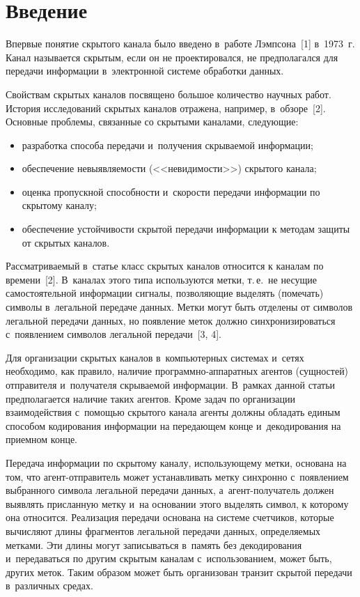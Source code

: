 \begin{multicols}{2}

\label{st\stat}
     
\section{Введение}
  
  Впервые понятие скрытого канала было введено в~работе Лэмпсона~[1] 
в~1973~г. Канал называется скрытым, если он не проектировался, не 
предполагался для передачи информации в~электронной системе обработки 
данных. 
  
  Свойствам скрытых каналов посвящено большое количество научных работ. 
История иссле\-дований скрытых каналов отражена, например, в~обзоре~[2]. 
Основные проблемы, связанные со скрытыми каналами, следующие:
  \begin{itemize}
\item разработка способа передачи и~получения скрываемой информации;
\item обеспечение невыявляемости (<<невидимости>>) скрытого канала;
\item оценка пропускной способности и~скорости передачи информации 
по скрытому каналу;
\item обеспечение устойчивости скрытой передачи информации к методам 
защиты от скрытых каналов. 
\end{itemize}

  Рассматриваемый в~статье класс скрытых каналов относится к каналам по 
времени~[2]. В~каналах этого типа используются метки, т.\,е.\ не несущие 
самостоятельной информации сигналы, позволяющие выделять (помечать) 
символы в~легальной передаче данных. Метки могут быть отделены от 
символов легальной передачи данных, но появление меток должно 
синхронизироваться с~появлением символов легальной передачи~[3, 4].
  
  Для организации скрытых каналов в~компьютерных системах и~сетях 
необходимо, как правило, наличие про\-граммно-ап\-па\-рат\-ных агентов 
(сущностей) отправителя и~получателя скрываемой информации. В~рамках 
данной статьи предполагается наличие таких агентов. Кроме задач по 
организации взаимодействия с~помощью скрытого канала агенты должны 
обладать единым способом кодирования информации на передающем конце 
и~декодирования на приемном конце. 
  
  Передача информации по скрытому каналу, использующему метки, основана 
на том, что агент-от\-пра\-ви\-тель может устанавливать метку синхронно 
с~появлением выбранного символа легальной передачи данных,  
а~агент-по\-лу\-ча\-тель должен выявлять присланную метку и~на основании 
этого выделять символ, к которому она относится. Реализация передачи 
основана на системе счетчиков, которые вычисляют длины фрагментов 
легальной передачи данных, определяемых метками. Эти длины могут 
записываться в~память без декодирования и~передаваться по другим скрытым 
каналам с~использованием, может быть, других меток. Таким образом может 
быть организован транзит скрытой передачи в~различных средах. 
  

\end{multicols}
